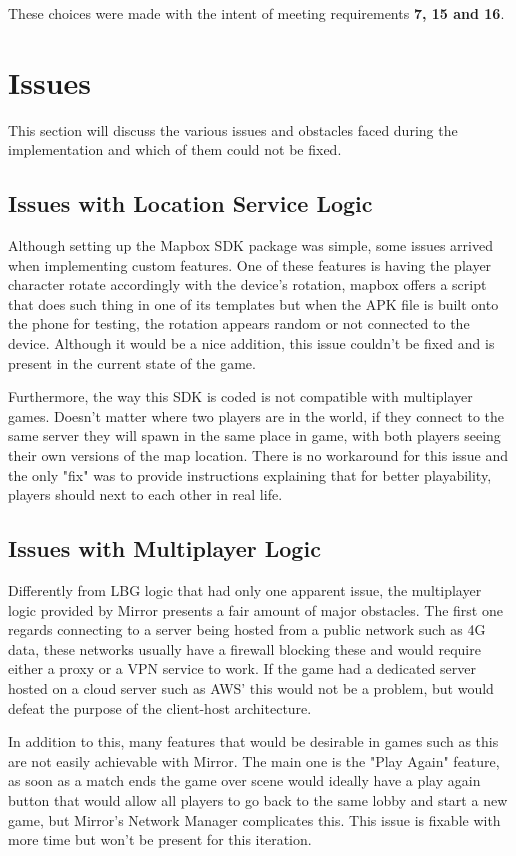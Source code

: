 \documentclass{dissertation}
\begin{document}
These choices were made with the intent of meeting requirements \textbf{7, 15 and 16}.

\section{Issues}

This section will discuss the various issues and obstacles faced during the implementation and which of them could not be fixed.

\subsection{Issues with Location Service Logic}
Although setting up the Mapbox SDK package was simple, some issues arrived when implementing custom features. One of these features is having the player character rotate accordingly with the device's rotation, mapbox offers a script that does such thing in one of its templates but when the APK file is built onto the phone for testing, the rotation appears random or not connected to the device. Although it would be a nice addition, this issue couldn't be fixed and is present in the current state of the game.

Furthermore, the way this SDK is coded is not compatible with multiplayer games. Doesn't matter where two players are in the world, if they connect to the same server they will spawn in the same place in game, with both players seeing their own versions of the map location. There is no workaround for this issue and the only "fix" was to provide instructions explaining that for better playability, players should next to each other in real life.

\subsection{Issues with Multiplayer Logic}
Differently from LBG logic that had only one apparent issue, the multiplayer logic provided by Mirror presents a fair amount of major obstacles. The first one regards connecting to a server being hosted from a public network such as 4G data, these networks usually have a firewall blocking these and would require either a proxy or a VPN service to work. If the game had a dedicated server hosted on a cloud server such as AWS' this would not be a problem, but would defeat the purpose of the client-host architecture.

In addition to this, many features that would be desirable in games such as this are not easily achievable with Mirror. The main one is the "Play Again" feature, as soon as a match ends the game over scene would ideally have a play again button that would allow all players to go back to the same lobby and start a new game, but Mirror's Network Manager complicates this. This issue is fixable with more time but won't be present for this iteration.
\end{document}
